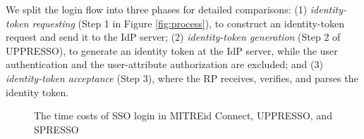  We split the login flow into three phases for detailed comparisons: (1)
{\em identity-token requesting} (Step 1 in Figure \ref{fig:process}), to construct an identity-token request and send it to the IdP server; (2) {\em identity-token generation} (Step 2 of UPPRESSO), to generate an identity token at the IdP server, while the user authentication and the user-attribute authorization are excluded; and (3) {\em identity-token acceptance} (Step 3), where the RP receives, verifies, and parses the identity token.

\begin{figure}[tb]
  \centering
  \caption{The time costs of SSO login in MITREid Connect, UPPRESSO, and SPRESSO}
  \label{fig:evaluation}
\end{figure}

